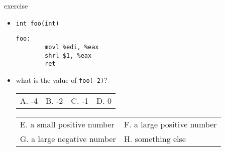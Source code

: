 \begin{frame}[fragile,label=negativeShrExercise]{exercise}
\begin{itemize}
\item \texttt{int foo(int)}
\begin{lstlisting}[language=myasm]
foo:
        movl %edi, %eax
        shrl $1, %eax
        ret
\end{lstlisting}
\item what is the value of \texttt{foo(-2)}? \\
\begin{tabular}{llll}
A. -4 & B. -2 & C. -1 & D. 0 \\
\end{tabular}
\begin{tabular}{ll}
E. a small positive number & F. a large positive number \\
G. a large negative number & H. something else \\
\end{tabular}
\end{itemize}
\end{frame}
